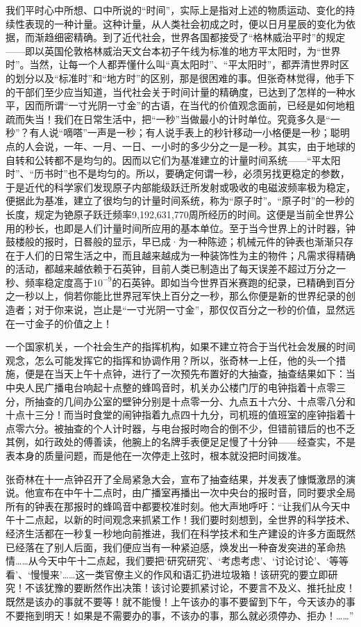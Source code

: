\par 我们平时心中所想、口中所说的“时间”，实际上是指对上述的物质运动、变化的持续性表现的一种计量。这种计量，从人类社会初成之时，便以日月星辰的变化为依据，而渐趋细密精确。到了近代社会，世界各国都接受了“格林威治平时”的规定——即以英国伦敦格林威治天文台本初子午线为标准的地方平太阳时，为“世界时”。当然，让每一个人都弄懂什么叫“真太阳时”、“平太阳时”，都弄清世界时区的划分以及“标准时”和“地方时”的区别，那是很困难的事。但张奇林觉得，他手下的干部们至少应当知道，当代社会关于时间计量的精确度，已达到了怎样的一种水平，因而所谓“一寸光阴一寸金”的古语，在当代的价值观念面前，已经是如何地粗疏而失当！我们在日常生活中，把“一秒”当做最小的计时单位。究竟多久是“一秒”？有人说“嘀嗒”一声是一秒；有人说手表上的秒针移动一小格便是一秒；聪明点的人会说，一年、一月、一日、一小时的多少分之一是一秒。其实，由于地球的自转和公转都不是均匀的。因而以它们为基准建立的计量时间系统——“平太阳时”、“历书时”也不是均匀的。所以，要确定何谓一秒，必须另找更稳定的参数，于是近代的科学家们发现原子内部能级跃迁所发射或吸收的电磁波频率极为稳定，便据此为基准，建立了很均匀的计量时间系统，称为“原子时”。“原子时”的一秒的长度，规定为铯原子跃迁频率9,192,631,770周所经历的时间。这便是当前全世界公用的秒长，也即是人们计量时间所应用的基本单位。至于当今世界上的计时器，钟鼓楼般的报时，日晷般的显示，早已成·为一种陈迹；机械元件的钟表也渐渐只存在于人们的日常生活之中，而且越来越成为一种装饰性为主的物件；凡需求得精确的活动，都越来越依赖于石英钟，目前人类已制造出了每天误差不超过万分之一秒、频率稳定度高于$10^{-9}$的石英钟。即如当今世界百米赛跑的纪录，已精确到百分之一秒以上，倘若你能比世界冠军快上百分之一秒，那么你便是新的世界纪录的创造者；对于你来说，岂止是“一寸光阴一寸金”，那仅仅百分之一秒的价值，显然远在一寸金子的价值之上！
\par 一个国家机关，一个社会生产的指挥机构，如果不建立符合于当代社会发展的时间观念，怎么可能发挥它的指挥和协调作用？所以，张奇林一上任，他的头一个措施，便是在当天上午十点钟，进行了一次预先布置好的大抽查，抽查结果如下：当中央人民广播电台响起十点整的蜂鸣音时，机关办公楼门厅的电钟指着十点零三分，所抽查的几间办公室的壁钟分别是十点零一分、九点五十六分、十点零八分和十点十三分！而当时食堂的闹钟指着九点四十九分，司机班的值班室的座钟指着十点零六分。被抽查的个人计时器，与电台报时吻合的倒不少，但错前错后的也不乏其例，如行政处的傅善读，他腕上的名牌手表便足足慢了十分钟——经查实，不是表本身的质量问题，而是他在一次停走上弦时，根本就没把时间拨准。
\par 张奇林在十一点钟召开了全局紧急大会，宣布了抽查结果，并发表了慷慨激昂的演说。他宣布在中午十二点时，由广播室再播出一次中央台的报时音，同时要求全局所有的钟表在那报时的蜂鸣音中都要校准时刻。他大声地呼吁：“让我们从今天中午十二点起，以新的时间观念来抓紧工作！我们要时刻想到，全世界的科学技术、经济生活都在一秒复一秒地向前推进，我们在科学技术和生产建设的许多方面既然已经落在了别人后面，我们便应当有一种紧迫感，焕发出一种奋发突进的革命热情……从今天中午十二点起，我们要把‘研究研究’、‘考虑考虑’、‘讨论讨论’、‘等等看’、‘慢慢来’……这一类官僚主义的作风和语汇扔进垃圾箱！该研究的要立即研究！不该犹豫的要断然作出决策！该讨论要抓紧讨论，不要言不及义、推托扯皮！既然是该办的事就不要等！就不能慢！上午该办的事不要留到下午，今天该办的事不要拖到明天！如果是不需要办的事，不该办的事，那么就必须停办、拒办！……”
